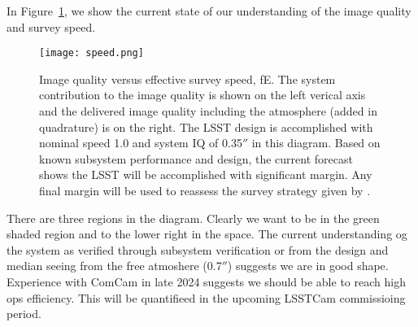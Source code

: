 In Figure~\ref{speed}, we show the current state of our understanding of the image quality and survey speed.

\begin{figure}[t]
  \centering
\texttt{[image: speed.png]}
\caption{Image quality versus effective survey speed, fE. The system contribution to the image quality is shown on the left verical axis and the delivered image quality including the atmosphere (added in quadrature) is on the right. The LSST design is accomplished with nominal speed 1.0 and system IQ of 0.35$''$ in this diagram. Based on known subsystem performance and design, the current forecast shows the LSST will be accomplished with significant margin. Any final margin will be used to reassess the survey strategy given by \cite{PSTN-056}.}
\label{speed}
\end{figure}

There are three regions in the diagram. Clearly we want to be in the green shaded region and to the lower right in the space. The current understanding og the system as verified through subsystem verification or from the design and median seeing from the free atmoshere (0.7$''$) suggests we are in good shape. Experience with ComCam in late 2024 suggests we should be able to reach high ops efficiency. This will be quantifieed in the upcoming LSSTCam commissioing period.  


